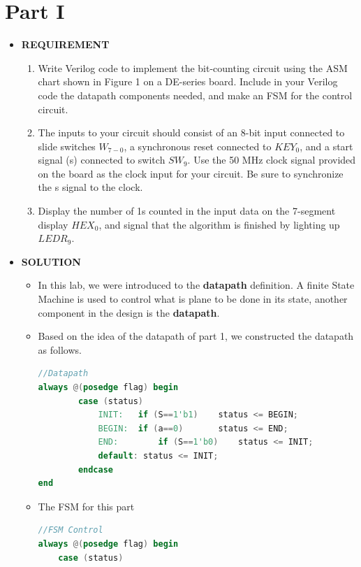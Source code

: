 \section{Part I}
\begin{itemize}
    \item []\textbf{REQUIREMENT}
        \begin{enumerate}
            \item Write Verilog code to implement the bit-counting circuit using the ASM chart shown in Figure 1 on a DE-series board. Include in your Verilog code the datapath components needed, and make an FSM for the control circuit.
            \item The inputs to your circuit should consist of an 8-bit input connected to slide switches $W_{7-0}$, a synchronous reset connected to $KEY_0$, and a start signal (s) connected to switch $SW_9$. Use the 50 MHz clock signal provided on the board as the clock input for your circuit. Be sure to synchronize the s signal to the clock.
            \item Display the number of 1s counted in the input data on the 7-segment display $HEX_0$, and signal that the algorithm is finished by lighting up $LEDR_9$.\\
        \end{enumerate}
    \item []\textbf{SOLUTION}
        \begin{itemize}
            \item []In this lab, we were introduced to the \textbf{datapath} definition. A finite State Machine is used to control what is plane to be done in its state, another component in the design is the \textbf{datapath}.
            \item []Based on the idea of the datapath of part 1, we constructed the datapath as follows. 
                \begin{lstlisting}[language=verilog]
//Datapath
always @(posedge flag) begin
        case (status)
            INIT: 	if (S==1'b1) 	status <= BEGIN;
            BEGIN: 	if (a==0) 		status <= END;
            END: 		if (S==1'b0)	status <= INIT;
            default: status <= INIT;
        endcase
end
                \end{lstlisting}
            \item []The FSM for this part
                \begin{lstlisting}[language=verilog]
//FSM Control
always @(posedge flag) begin
    case (status)

\end{lstlisting}
\end{itemize}
\end{itemize}
